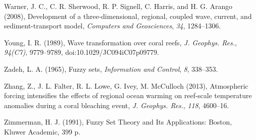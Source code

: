 \documentclass[default,jgrga]{agutex2015}
\begin{document}
\begin{article}
\begin{thebibliography}{}
Warner, J. C., C. R. Sherwood, R. P. Signell, C. Harris, and H. G. Arango (2008), Development of a three-dimensional, regional, coupled wave, current, and sediment-transport model, \textit{Computers and Geosciences}, \textit{34}, 1284--1306.

Young, I. R. (1989), Wave transformation over coral reefs, \textit{J. Geophys. Res.}, \textit{94(C7)}, 9779--9789, doi:10.1029/JC094iC07p09779.

Zadeh, L. A. (1965), Fuzzy sets, \textit{Information and Control}, \textit{8}, 338--353.

Zhang, Z., J. L. Falter, R. L. Lowe, G. Ivey, M. McCulloch (2013), Atmospheric forcing intensifies the effects of regional ocean warming on reef-scale temperature anomalies during a coral bleaching event, \textit{J. Geophys. Res.}, \textit{118}, 4600–16.

Zimmerman, H. J. (1991), Fuzzy Set Theory and Its Applications: Boston, Kluwer Academic, 399 p.

%
%
%
%

\end{thebibliography}


\end{article}
\end{document}
